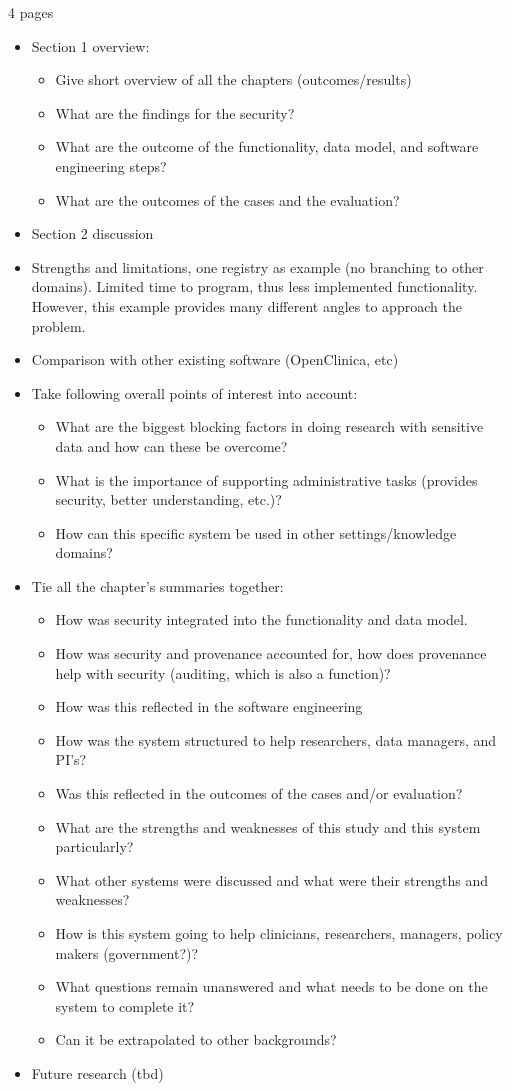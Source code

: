 4 pages

\begin{itemize}
	\item Section 1 overview:
	\begin{itemize}		
		\item Give short overview of all the chapters (outcomes/results)
		\item What are the findings for the security?
		\item What are the outcome of the functionality, data model, and software engineering steps?
		\item What are the outcomes of the cases and the evaluation?
	\end{itemize}
	\item Section 2 discussion
	\item Strengths and limitations, one registry as example (no branching to other domains). 
	Limited time to program, thus less implemented functionality.
	However, this example provides many different angles to approach the problem.
	\item Comparison with other existing software (OpenClinica, etc)
	\item Take following overall points of interest into account:
	\begin{itemize}
		\item What are the biggest blocking factors in doing research with sensitive data and how can these be overcome?
		\item What is the importance of supporting administrative tasks (provides security, better understanding, etc.)? 
		\item How can this specific system be used in other settings/knowledge domains?
	\end{itemize}
	\item Tie all the chapter's summaries together:
	\begin{itemize}
		\item How was security integrated into the functionality and data model.
		\item How was security and provenance accounted for, how does provenance help with security (auditing, which is also a function)?
		\item How was this reflected in the software engineering
		\item How was the system structured to help researchers, data managers, and PI's?
		\item Was this reflected in the outcomes of the cases and/or evaluation?
		\item What are the strengths and weaknesses of this study and this system particularly?
		\item What other systems were discussed and what were their strengths and weaknesses?
		\item How is this system going to help clinicians, researchers, managers, policy makers (government?)?
		\item What questions remain unanswered and what needs to be done on the system to complete it?
		\item Can it be extrapolated to other backgrounds?
	\end{itemize}
	\item Future research (tbd)
\end{itemize}